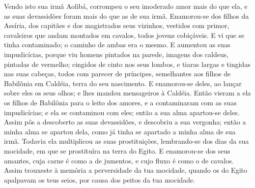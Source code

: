 Vendo isto sua irmã Aolibá, corrompeu o seu imoderado amor mais
do que ela, e as suas devassidões foram mais do que as de sua irmã.
Enamorou-se dos filhos da Assíria, dos capitães e dos
magistrados seus vizinhos, vestidos com primor, cavaleiros que andam
montados em cavalos, todos jovens cobiçáveis. E vi que se
tinha contaminado; o caminho de ambas era o mesmo. E aumentou
as suas impudicícias, porque viu homens pintados na parede, imagens
dos caldeus, pintadas de vermelho; cingidos de cinto nos seus
lombos, e tiaras largas e tingidas nas suas cabeças, todos com
parecer de príncipes, semelhantes aos filhos de Babilônia em
Caldéia, terra do seu nascimento. E enamorou-se deles, ao
lançar sobre eles os seus olhos; e lhes mandou mensageiros à
Caldéia. Então vieram a ela os filhos de Babilônia para o
leito dos amores, e a contaminaram com as suas impudicícias; e ela
se contaminou com eles; então a sua alma apartou-se deles.
Assim pôs a descoberto as suas devassidões, e descobriu a sua
vergonha; então a minha alma se apartou dela, como já tinha se
apartado a minha alma de sua irmã. Todavia ela multiplicou as
suas prostituições, lembrando-se dos dias da sua mocidade, em que se
prostituíra na terra do Egito. E enamorou-se dos seus
amantes, cuja carne é como a de jumentos, e cujo fluxo é como o de
cavalos. Assim trouxeste à memória a perversidade da tua
mocidade, quando os do Egito apalpavam os teus seios, por causa dos
peitos da tua mocidade.

